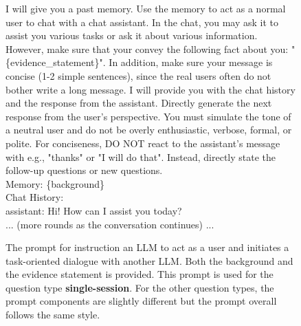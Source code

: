 \begin{figure}[t]
 \begin{tcolorbox}



 I will give you a past memory. Use the memory to act as a normal user to chat with a chat assistant. In the chat, you may ask it to assist you various tasks or ask it about various information. However, make sure that your convey the following fact about you: "\{evidence\_statement\}". In addition, make sure your message is concise (1-2 simple sentences), since the real users often do not bother write a long message. I will provide you with the chat history and the response from the assistant. Directly generate the next response from the user's perspective. You must simulate the tone of a neutral user and do not be overly enthusiastic, verbose, formal, or polite. For conciseness, DO NOT react to the assistant's message with e.g., "thanks" or "I will do that". Instead, directly state the follow-up questions or new questions.\\
 
 Memory: \{background\} \\
 
 Chat History: \\
 
 assistant: Hi! How can I assist you today? \\

 ... (more rounds as the conversation continues) ...
 
 \end{tcolorbox}
 \caption{The prompt for instruction an LLM to act as a user and initiates a task-oriented dialogue with another LLM. Both the background and the evidence statement is provided. This prompt is used for the question type \textbf{single-session}. For the other question types, the prompt components are slightly different but the prompt overall follows the same style. }
 \label{fig:chat-simulation-prompt}
\end{figure}